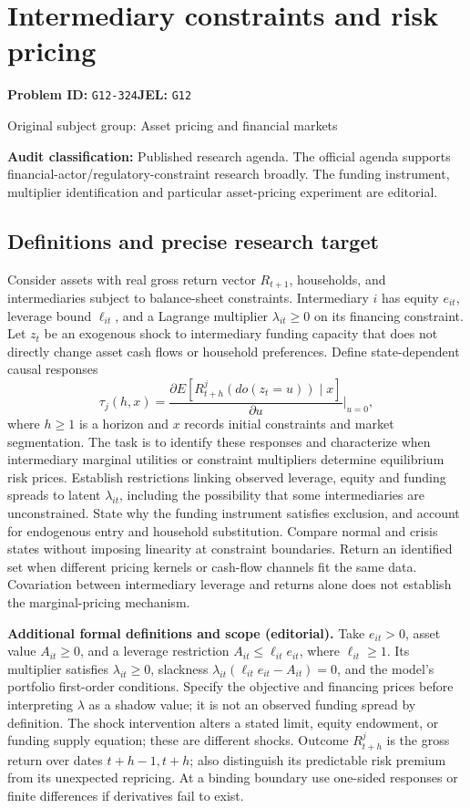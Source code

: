 \documentclass[11pt,a4paper]{article}
\begin{document}
\section*{Intermediary constraints and risk pricing}
\textbf{Problem ID:} \texttt{G12-324}\quad \textbf{JEL:} \texttt{G12}\par
\label{problem:OP-0316}
{\sffamily\small\color{muted}Original subject group: Asset pricing and financial markets\par}
\label{definitions:problem:30007598}
\textbf{Audit classification:} Published research agenda. The official agenda supports financial-actor/regulatory-constraint research broadly. The funding instrument, multiplier identification and particular asset-pricing experiment are editorial.
\subsection*{Definitions and precise research target}
Consider assets with real gross return vector \(R_{t+1}\), households, and intermediaries subject to balance-sheet constraints. Intermediary \(i\) has equity \(e_{it}\), leverage bound \(\ell_{it}\), and a Lagrange multiplier \(\lambda_{it}\geq0\) on its financing constraint. Let \(z_t\) be an exogenous shock to intermediary funding capacity that does not directly change asset cash flows or household preferences. Define state-dependent causal responses
\[\tau_j(h,x)=\frac{\partial E[R^j_{t+h}(do(z_t=u))\mid x]}{\partial u}\Big|_{u=0},\]
where \(h\geq1\) is a horizon and \(x\) records initial constraints and market segmentation. The task is to identify these responses and characterize when intermediary marginal utilities or constraint multipliers determine equilibrium risk prices. Establish restrictions linking observed leverage, equity and funding spreads to latent \(\lambda_{it}\), including the possibility that some intermediaries are unconstrained. State why the funding instrument satisfies exclusion, and account for endogenous entry and household substitution. Compare normal and crisis states without imposing linearity at constraint boundaries. Return an identified set when different pricing kernels or cash-flow channels fit the same data. Covariation between intermediary leverage and returns alone does not establish the marginal-pricing mechanism.

\textbf{Additional formal definitions and scope (editorial).} Take \(e_{it}>0\), asset value \(A_{it}\geq0\), and a leverage restriction \(A_{it}\leq\ell_{it}e_{it}\), where \(\ell_{it}\geq1\). Its multiplier satisfies \(\lambda_{it}\geq0\), slackness \(\lambda_{it}(\ell_{it}e_{it}-A_{it})=0\), and the model's portfolio first-order conditions. Specify the objective and financing prices before interpreting \(\lambda\) as a shadow value; it is not an observed funding spread by definition. The shock intervention alters a stated limit, equity endowment, or funding supply equation; these are different shocks. Outcome \(R^j_{t+h}\) is the gross return over dates \(t+h-1,t+h\); also distinguish its predictable risk premium from its unexpected repricing. At a binding boundary use one-sided responses or finite differences if derivatives fail to exist.
\end{document}
